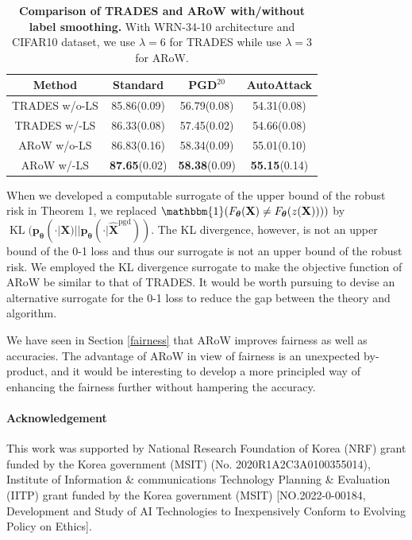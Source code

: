 \documentclass[nohyperref]{article}
\theoremstyle{plain}
\theoremstyle{definition}
\theoremstyle{remark}
\begin{document}
\begin{table}
    \small
    \caption{\textbf{Comparison of TRADES and ARoW with/without label smoothing.} With WRN-34-10 architecture and CIFAR10 dataset, we use $\lambda=6$ for TRADES while use $\lambda=3$ for ARoW.}
    \centering
    \begin{tabular}{c|ccc}
    \hline
    \textbf{Method} & \textbf{Standard}  & $\textbf{PGD}^{20}$ & \textbf{AutoAttack}  \\
    \hline
    \hline
    TRADES w/o-LS   & 85.86(0.09) & 56.79(0.08) & 54.31(0.08) \\
    TRADES w/-LS   & 86.33(0.08) & 57.45(0.02) & 54.66(0.08) \\
    ARoW w/o-LS    & 86.83(0.16) & 58.34(0.09) & 55.01(0.10) \\
    ARoW w/-LS    & \textbf{87.65}(0.02) & \textbf{58.38}(0.09) & \textbf{55.15}(0.14) \\
    \hline
    \end{tabular}
    \label{effect-ls}
    \vskip -0.1in
\end{table}


When we developed a computable surrogate of the upper bound of the robust risk in Theorem 1,
we replaced $\mathbbm{1}( F_{\bm{\theta}}(\mathbf{X})
\neq F_{\bm{\theta}}(z(\mathbf{X})))
)$ by $\operatorname{KL}(\mathbf{p}_{\bm{\theta}}(\cdot|\mathbf{X}) || \mathbf{p}_{\bm{\theta}}(\cdot|\widehat{\mathbf{X}}^{\text{pgd}})).$
The KL divergence, however, is not an upper bound of the 0-1 loss and thus our
surrogate is not an upper bound of the robust risk. 
We employed the KL divergence surrogate to make the objective function of ARoW be similar
to that of TRADES. It would be worth pursuing to
devise an alternative surrogate for the 0-1 loss to reduce the gap between the theory and algorithm.

We have seen in Section \ref{fairness} that ARoW improves
fairness as well as accuracies.
The advantage of ARoW in view of fairness
is an unexpected by-product, and it would be interesting to
develop a more principled way of enhancing the fairness further without
hampering the accuracy.

\paragraph{Acknowledgement}
This work was supported by National Research Foundation of Korea (NRF) grant funded by the Korea government (MSIT) (No. 2020R1A2C3A0100355014), Institute of Information \& communications Technology Planning \& Evaluation (IITP) grant funded by the Korea government (MSIT) 
[NO.2022-0-00184, Development and Study of AI Technologies to Inexpensively Conform to Evolving Policy on Ethics].
\end{document}
